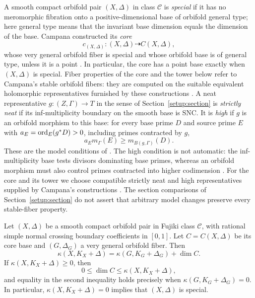 A smooth compact orbifold pair $(X,\Delta)$ in class $\mathcal C$ is
\emph{special} if it has no meromorphic fibration onto a
positive-dimensional base of orbifold general type; here general
type means that the invariant base dimension equals the dimension
of the base.  Campana constructed its \emph{core}
\[
 c_{(X,\Delta)}:(X,\Delta)\dashrightarrow C(X,\Delta),
\]
whose very general orbifold fiber is special and whose orbifold base is of general
type, unless it is a point
\cite[Theorem~9.1]{CampanaOrbifolds}.  In particular, the core has
a point base exactly when $(X,\Delta)$ is special. Fiber properties
of the core and the tower below refer to Campana's stable orbifold
fibers: they are computed on the suitable equivalent holomorphic
representatives furnished by these constructions
\cite[Definition~2.49 and \S7.1]{CampanaOrbifolds}.
A neat representative $g:(Z,\Gamma)\to T$ in the sense of
Section~\ref{setup:section} is \emph{strictly neat} if its
inf-multiplicity boundary on the smooth base is SNC. It is
\emph{high} if $g$ is an orbifold morphism to this base: for every
base prime $D$ and source prime $E$ with
$a_E=\operatorname{ord}_E(g^*D)>0$, including primes contracted by $g$,
\[
              a_E m_\Gamma(E)\geq m_{B(g,\Gamma)}(D).
\]
These are the model conditions of
\cite[Definition~3.8 and Proposition~3.10]{CampanaOrbifolds}.
The high condition is not automatic: the inf-multiplicity base tests
divisors dominating base primes, whereas an orbifold morphism must
also control primes contracted into higher codimension
\cite[Remark~3.3(2)]{CampanaOrbifolds}.
For the core and its tower we choose compatible strictly neat and
high representatives supplied by Campana's constructions
\cite[Proposition~3.15 and Corollary~4.14]{CampanaOrbifolds}.
The section comparisons of Section~\ref{setup:section} do not
assert that arbitrary model changes preserve every stable-fiber
property.

\begin{corollary}
\label{spec:core-dimension}
Let $(X,\Delta)$ be a smooth compact orbifold pair in Fujiki class
$\mathcal C$, with rational simple normal crossing boundary
coefficients in $[0,1]$.  Let $C=C(X,\Delta)$ be its core base and
$(G,\Delta_G)$ a very general orbifold fiber.  Then
\begin{equation}\label{spec:core-equality}
 \kappa(X,K_X+\Delta)
   =\kappa(G,K_G+\Delta_G)+\dim C.
\end{equation}
If $\kappa(X,K_X+\Delta)\geq0$, then
\[
 0\leq\dim C\leq\kappa(X,K_X+\Delta),
\]
and equality in the second inequality holds precisely when
$\kappa(G,K_G+\Delta_G)=0$.
In particular, $\kappa(X,K_X+\Delta)=0$ implies that
$(X,\Delta)$ is special.
\end{corollary}

